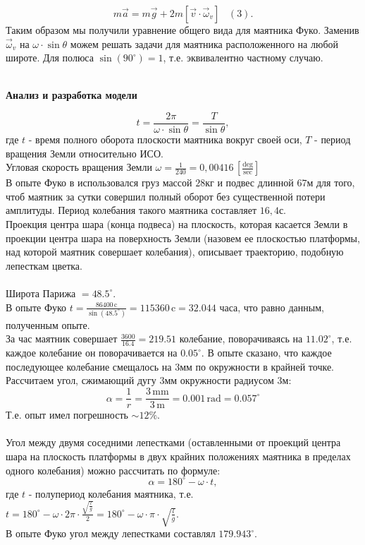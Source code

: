 \documentclass[11pt]{article}
\begin{document}
$$m\vec{a}=m\vec{g}+2m[\vec{v}\cdot\vec{\omega}_{v}]\,\,\,\,\,(3).$$
Таким образом мы получили уравнение общего вида для маятника Фуко. Заменив $\vec{\omega}_{v}$ на $\omega\cdot\sin\theta$ можем решать задачи для маятника расположенного на любой широте. Для полюса $\sin(90^{\circ})=1$, т.е. эквивалентно частному случаю.\\
\\\begin{center}
	\textbf{{\large Анализ и разработка модели}}
\end{center}
$$t=\frac{2\pi}{\omega\cdot\sin\theta}=\frac{T}{\sin\theta},$$
где $t$ - время полного оборота плоскости маятника вокруг своей оси, $T$ - период вращения Земли относительно ИСО.\\
Угловая скорость вращения Земли $\omega=\frac1{240}=0,00416\, [\frac{\mathrm{deg}}{\mathrm{sec}}]$\\
В опыте Фуко в использовался груз массой $28$кг и подвес длинной $67$м для того, чтоб маятник за сутки совершил полный оборот без существенной потери амплитуды. Период колебания такого маятника составляет $16,4$с.\\
Проекция центра шара (конца подвеса) на плоскость, которая касается Земли в проекции центра шара на поверхность Земли (назовем ее плоскостью платформы, над которой маятник совершает колебания), описывает траекторию, подобную лепесткам цветка.\\
\\
Широта Парижа $= 48.5^\circ$.\\
В опыте Фуко $t=\frac{86400\,\mathrm{c}}{\sin(48.5^{\circ})}=115360\,\mathrm{c}=32.044$ часа, что равно данным, полученным  опыте.\\
За час маятник совершает $\frac{3600}{16.4} = 219.51$ колебание, поворачиваясь на $11.02^{\circ}$, т.е. каждое колебание он поворачивается на $0.05^{\circ}$. В опыте сказано, что каждое последующее колебание смещалось на $3$мм по окружности в крайней точке. Рассчитаем угол, сжимающий дугу $3$мм окружности радиусом $3$м:
$$\alpha = \frac{1}{r} = \frac{3\,\mathrm{mm}}{3\,\mathrm{m}} = 0.001\,\mathrm{rad} = 0.057^{\circ}$$
Т.е. опыт имел погрешность $\sim12\%$.\\
\\
Угол между двумя соседними лепестками (оставленными от проекций центра шара на плоскость платформы в двух крайних положениях маятника в пределах одного колебания) можно рассчитать по формуле:
$$\alpha = 180^{\circ} - \omega\cdot t,$$
где $t$ - полупериод колебания маятника, т.е. $t=180^{\circ} - \omega\cdot2\pi\cdot\frac{\sqrt{\frac lg}}2= 180^{\circ} - \omega\cdot\pi\cdot\sqrt{\frac lg}.$\\
В опыте Фуко угол между лепестками составлял $179.943^{\circ}$.
\end{document}
